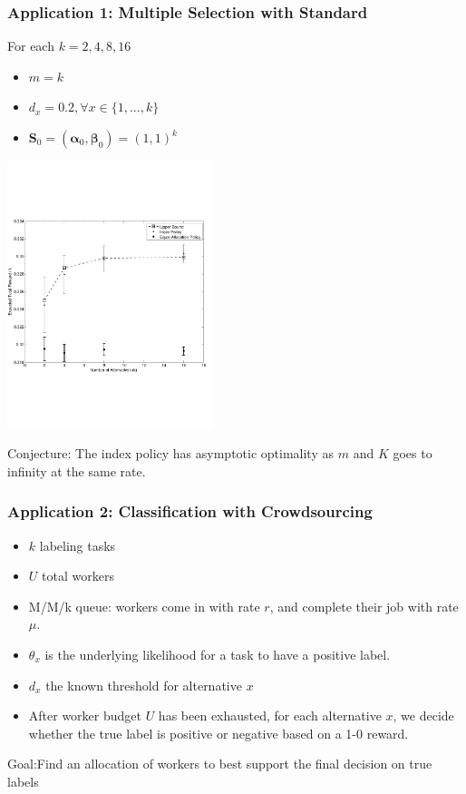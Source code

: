 \documentclass{beamer}
\newcommand{\Sv}{\mathbf{S}}
\newcommand{\betav}{\pmb{\beta}}
\newcommand{\alphav}{\pmb{\alpha}}
\begin{document}
\begin{frame}
\frametitle{Application 1: Multiple Selection with Standard}
For each $k=2,4,8,16$
\begin{itemize}
\item $m = k$
\item $d_x = 0.2, \forall x \in \{1,...,k\}$
\item $\Sv_0=(\alphav_0,\betav_0)=(1,1)^k$
\end{itemize}
\vspace{-1cm}
\begin{center}
\includegraphics[width=60mm]{simPlots_0707_cropped.pdf}
\end{center}
Conjecture: The index policy has asymptotic optimality as $m$ and $K$ goes to infinity at the same rate.
\end{frame}

\begin{frame}
\frametitle{Application 2: Classification with Crowdsourcing}
\begin{itemize}
\item $k$ labeling tasks
\item $U$ total workers
\item M/M/k queue: workers come in with rate $r$, and complete their job with rate $\mu$.
\item $\theta_x$ is the underlying likelihood for a task to have a positive label.
\item $d_x$ the known threshold for alternative $x$
\item After worker budget $U$ has been exhausted, for each alternative $x$, we decide whether the true label is positive or negative based on a 1-0 reward.
\end{itemize}
{\Large \color{red} Goal:Find an allocation of workers to best support the final decision on true labels}
\end{frame}
\end{document}
